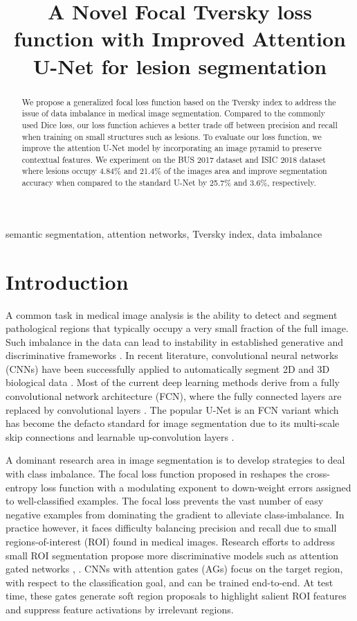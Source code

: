 \documentclass{article}
\title{A Novel Focal Tversky loss function with Improved Attention U-Net for lesion segmentation}
\begin{document}
\maketitle
\begin{abstract}
We propose a generalized focal loss function based on the Tversky index to address the issue of data imbalance in medical image segmentation. Compared to the commonly used Dice loss, our loss function achieves a better trade off between precision and recall when training on small structures such as lesions. To evaluate our loss function, we improve the attention U-Net model by incorporating an image pyramid to preserve contextual features. We experiment on the BUS 2017 dataset and ISIC 2018 dataset where lesions occupy 4.84\% and 21.4\% of the images area and improve segmentation accuracy when compared to the standard U-Net by 25.7\% and 3.6\%, respectively.  
\end{abstract}

\begin{keywords}
semantic segmentation, attention networks, Tversky index, data imbalance
\end{keywords}

\section{Introduction}
\label{sec:intro}

A common task in medical image analysis is the ability to detect and segment pathological regions that typically occupy a very small fraction of the full image. Such imbalance in the data can lead to instability in established generative and discriminative frameworks \cite{sudre}. In recent literature, convolutional neural networks (CNNs) have been successfully applied to automatically segment 2D and 3D biological data \cite{sudre}. Most of the current deep learning methods derive from a fully convolutional network architecture (FCN), where the fully connected layers are replaced by convolutional layers \cite{long}. The popular U-Net is an FCN variant which has become the defacto standard for image segmentation due to its multi-scale skip connections and learnable up-convolution layers \cite{ronne}. 

A dominant research area in image segmentation is to develop strategies to deal with class imbalance. The focal loss function proposed in \cite{focalloss} reshapes the cross-entropy loss function with a modulating exponent to down-weight errors assigned to well-classified examples. The focal loss prevents the vast number of easy negative examples from dominating the gradient to alleviate class-imbalance. In practice however, it faces difficulty balancing precision and recall due to small regions-of-interest (ROI) found in medical images. Research efforts to address small ROI segmentation propose more discriminative models such as attention gated networks \cite{oktay}, \cite{lin}. CNNs with attention gates (AGs) focus on the target region, with respect to the classification goal, and can be trained end-to-end. At test time, these gates generate soft region proposals to highlight salient ROI features and suppress feature activations by irrelevant regions. 
\end{document}
